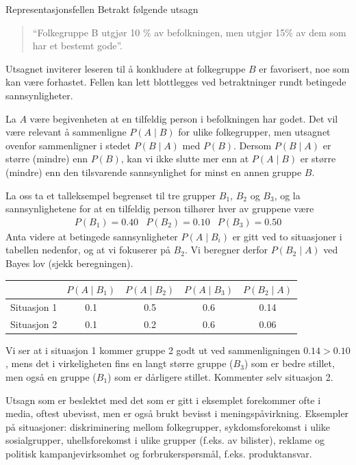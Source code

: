 \begin{eksempel}{Representasjonsfellen}
Betrakt følgende utsagn
\begin{quote}
``Folkegruppe B utgjør 10 \% av befolkningen, men utgjør 15\% av
dem som har et bestemt gode''.
\end{quote}
Utsagnet inviterer leseren til å konkludere at folkegruppe $B$ er
favorisert, noe som kan være forhastet.  Fellen kan lett blottlegges
ved betraktninger rundt betingede sannsynligheter.

La $A$ være begivenheten at en tilfeldig person i befolkningen har godet.
Det vil være relevant å sammenligne $P(A\mid B)$ for ulike 
folkegrupper, men utsagnet ovenfor sammenligner i stedet $P(B \mid A)$ med
$P(B)$.  Dersom $P(B \mid A)$ er større (mindre) enn $P(B)$, kan vi ikke
slutte mer enn at $P(A \mid B)$ er større (mindre) enn den tilsvarende 
sannsynlighet for minst en annen gruppe $B$.

La oss ta et talleksempel begrenset til tre grupper $B_1$, $B_2$ og $B_3$,
og la sannsynlighetene for at en tilfeldig person tilhører hver av gruppene
være
\begin{eqnarray*}
  P(B_1) = 0.40  &   P(B_2) = 0.10  &   P(B_3) = 0.50    
\end{eqnarray*}
Anta videre at betingede sannsynligheter $P(A \mid B_i)$ er gitt ved to
situasjoner i tabellen nedenfor, og at vi fokuserer på $B_2$.  Vi beregner
derfor $P(B_2 \mid A)$ ved Bayes lov (sjekk beregningen).
\begin{center}
\begin{tabular}{l|ccc|c}
    &$P(A \mid B_1)$&$P(A \mid B_2)$&$P(A \mid B_3)$ &$P(B_2 \mid A)$\\ \hline
Situasjon 1 &       0.1    &       0.5      &      0.6      &    0.14  \\
Situasjon 2 &       0.1    &       0.2      &      0.6      &    0.06
\end{tabular}
\end{center}
Vi ser at i situasjon 1 kommer gruppe 2 godt ut ved sammenligningen 
$0.14 > 0.10$, mens det i virkeligheten fins en langt større gruppe ($B_3$)
som er bedre stillet, men også en gruppe ($B_1$) som er dårligere
stillet.  Kommenter selv situasjon 2. 
\end{eksempel}

Utsagn som er beslektet med det som er gitt i eksemplet forekommer ofte i
media, oftest ubevisst, men er også brukt bevisst i meningspåvirkning.
Eksempler på situasjoner:
diskriminering mellom folkegrupper,
sykdomsforekomst i ulike sosialgrupper,
uhellsforekomst i ulike grupper (f.eks. av bilister),
reklame og politisk kampanjevirksomhet og
forbrukerspørsmål, f.eks. produktansvar.
\mbox{} \\

